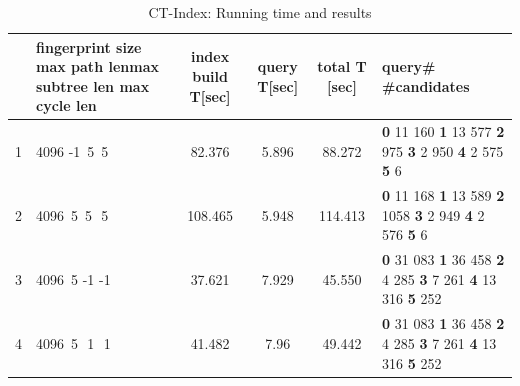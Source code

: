 \documentclass{l4proj}
\begin{document}
\newcommand\TstrutT{\rule{0pt}{2.6ex}}         %
\newcommand\Bstrut{\rule[-1ex]{0pt}{0pt}} 
\begin{table}[H]
\caption{CT-Index: Running time and results}
\label{table:runningTime}
\begin{center}
\begin{tabular}{ |c|p{25mm}|c|c|c|p{18mm}|}\hline
 & fingerprint size \newline max path len\newline max subtree len \newline max cycle len & index build T[sec]& query T[sec]& total T [sec] & \textbf{query\#} \#candidates\TstrutT\Bstrut\\
 \hline
1& 4096 -1 \,5 \,5  & 82.376 & 5.896 & 88.272 & \textbf{0} 11 160 \newline \textbf{1} 13 577 \newline \textbf{2} 975 \newline \textbf{3} 2 950 \newline \textbf{4} 2 575 \newline \textbf{5} 6 \TstrutT\Bstrut\\ 
 \hline
2 & 4096 \,5 \,5 \,\,5 & 108.465  & 5.948 & 114.413 & \textbf{0} 11 168 \newline \textbf{1} 13 589 \newline \textbf{2} 1058 \newline \textbf{3} 2 949 \newline \textbf{4} 2 576 \newline \textbf{5} 6 \TstrutT\Bstrut \\ 
 \hline
3 & 4096 \,5 -1 -1 & 37.621  & 7.929 & 45.550 & \textbf{0} 31 083 \newline \textbf{1} 36 458 \newline \textbf{2} 4 285 \newline \textbf{3} 7 261 \newline \textbf{4} 13 316 \newline \textbf{5} 252 \TstrutT\Bstrut \\ 
 \hline 
4 & 4096 \,5 \,\,1 \,\,1 & 41.482  & 7.96 & 49.442 & \textbf{0} 31 083 \newline \textbf{1} 36 458 \newline \textbf{2} 4 285 \newline \textbf{3} 7 261 \newline \textbf{4} 13 316 \newline \textbf{5} 252 \TstrutT\Bstrut\\ 

\end{tabular}
\end{center}
\end{table}
\end{document}
